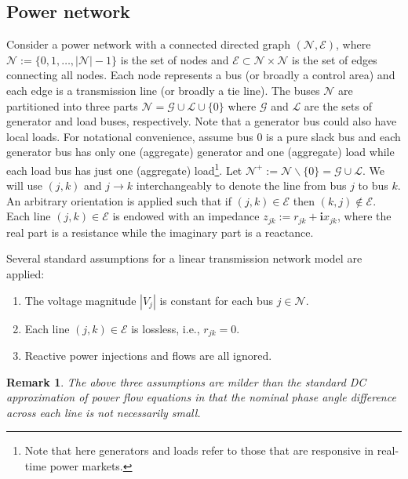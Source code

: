 \documentclass[journal,12pt,onecolumn,draftclsnofoot]{IEEEtran}
\newtheorem{remark}{\textbf{Remark}}
\begin{document}
\subsection{Power network}

Consider a power network with a connected directed graph $(\mathcal{N},\mathcal{E})$, where $\mathcal{N}:=\{0,1,\dots,|\mathcal{N}|-1\}$ is the set of nodes and $\mathcal{E}\subset\mathcal{N}\times\mathcal{N}$ is the set of edges connecting all nodes. Each node represents a bus (or broadly a control area) and each edge is a transmission line (or broadly a tie line). The buses $\mathcal{N}$ are partitioned into three parts $\mathcal{N}=\mathcal{G}\cup\mathcal{L}\cup\{0\}$ where $\mathcal{G}$ and $\mathcal{L}$ are the sets of generator and load buses, respectively. Note that a generator bus could also have local loads. For notational convenience, assume bus 0 is a pure slack bus and each generator bus has only one (aggregate) generator and one (aggregate) load while each load bus has just one (aggregate) load\footnote{Note that here generators and loads refer to those that are responsive in real-time power markets.}. Let $\mathcal{N}^+:=\mathcal{N}\backslash \{0\}=\mathcal{G}\cup\mathcal{L}$.
We will use $(j,k)$ and $j\rightarrow k$ interchangeably to denote the line from bus $j$ to bus $k$. An arbitrary orientation is applied such that if $(j,k)\in\mathcal{E}$ then $(k,j)\notin\mathcal{E}$. Each line $(j,k)\in\mathcal{E}$ is endowed with an impedance $z_{jk}:=r_{jk}+ \mathrm{\textbf{i}} x_{jk}$, where the real part is a resistance while the imaginary part is a reactance. 

Several standard assumptions for a linear transmission network model are applied:
\begin{enumerate}
	\item The voltage magnitude $|V_j|$ is constant for each bus $j\in\mathcal{N}$.
	\item Each line $(j,k)\in\mathcal{E}$ is lossless, i.e., $r_{jk}=0$.
	\item Reactive power injections and flows are all ignored.
\end{enumerate}
\begin{remark}
	The above three assumptions are milder than the standard DC approximation of power flow equations in that the nominal phase angle difference across each line is not necessarily small.  
\end{remark}
\end{document}
